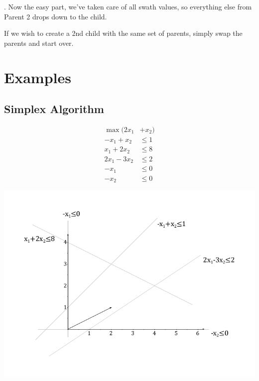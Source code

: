 \documentclass[11pt]{article}
\begin{document}
. Now the easy part, we've taken care of all swath values, so everything else from Parent 2 drops down to the child.

If we wish to create a 2nd child with the same set of parents, simply swap the parents and start over.

\clearpage
\appendix

\section{Examples}
\subsection{Simplex Algorithm}
\label{app:sec:simplexalgorithm}
\begin{minipage}{0.4\linewidth}
	\begin{align*}
	\max(2x_1 &+ x_2)\\
	-x_1 + x_2 &\leq 1\\
	x_1 + 2x_2 &\leq 8\\
	2x_1 - 3x_2 &\leq 2\\
	-x_1 &\leq 0\\
	-x_2 &\leq 0
	\end{align*}
\end{minipage}
\begin{minipage}{0.6\linewidth}
	\begin{center}
		\includegraphics[width=\linewidth,keepaspectratio]{simplex_example}
	\end{center}
\end{minipage}
\end{document}
